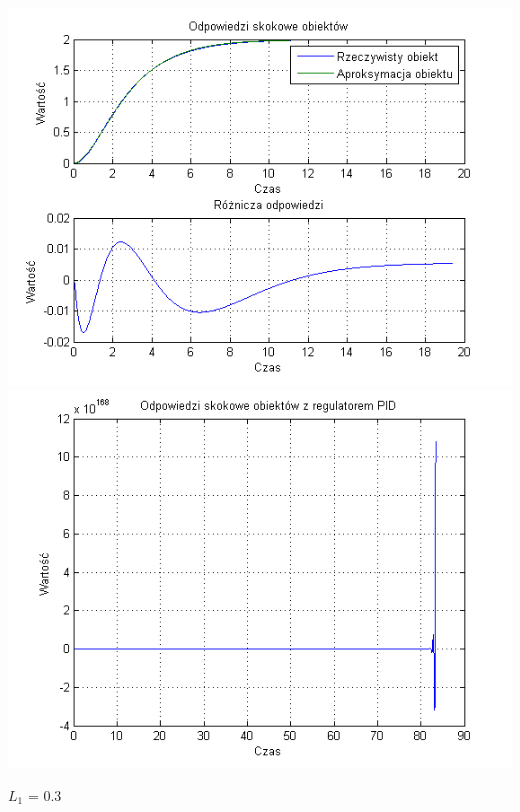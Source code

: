 \documentclass[10pt,a4paper]{article}
\begin{document}
\begin{center}
\includegraphics[scale=1]{images/dwa/skrypt_177.png}\\
\includegraphics[scale=1]{images/dwa/skrypt_178.png}\\
\end{center}
\newpage
$L_1$ = 0.3
\end{document}
